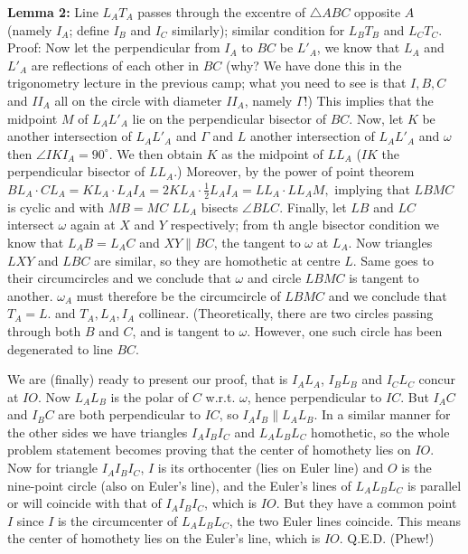 \documentclass[11pt,a4paper]{article}
\begin{document}
\begin{enumerate}
\textbf {Lemma 2:} Line $L_AT_A$ passes through the excentre of $\triangle ABC$ opposite $A$ (namely $I_A$; define $I_B$ and $I_C$ similarly); similar condition for $L_BT_B$ and $L_CT_C$.\\
Proof: Now let the perpendicular from $I_A$ to $BC$ be $L'_A$, we know that $L_A$ and $L'_A$ are reflections of each other in $BC$ (why? We have done this in the trigonometry lecture in the previous camp; what you need to see is that $I, B, C$ and $II_A$ all on the circle with diameter $II_A$, namely $\Gamma$!) This implies that the midpoint $M$ of $L_AL'_A$ lie on the perpendicular bisector of $BC$. Now, let $K$ be another intersection of $L_AL'_A$ and $\Gamma$ and $L$ another intersection of $L_AL'_A$ and $\omega$ then $\angle IKI_A=90^{\circ}$. We then obtain $K$ as the midpoint of $LL_A$ ($IK$ the perpendicular bisector of $LL_A$.) Moreover, by the power of point theorem $BL_A\cdot CL_A=KL_A\cdot L_AI_A=2KL_A\cdot\frac{1}{2} L_AI_A=LL_A\cdot LL_AM,$ implying that $LBMC$ is cyclic and with $MB=MC$ $LL_A$ bisects $\angle BLC$. Finally, let $LB$ and $LC$ intersect $\omega$ again at $X$ and $Y$ respectively; from th angle bisector condition we know that $L_AB=L_AC$ and $XY\parallel BC$, the tangent to $\omega$ at $L_A$. Now triangles $LXY$ and $LBC$ are similar, so they are homothetic at centre $L$. Same goes to their circumcircles and we conclude that $\omega$ and circle $LBMC$ is tangent to another. $\omega_A$ must therefore be the circumcircle of $LBMC$ and we conclude that $T_A=L$. and $T_A, L_A, I_A$ collinear. (Theoretically, there are two circles passing through both $B$ and $C$, and is tangent to $\omega$. However, one such circle has been degenerated to line $BC$.

We are (finally) ready to present our proof, that is $I_AL_A$, $I_BL_B$ and $I_CL_C$ concur at $IO$. Now $L_AL_B$ is the polar of $C$ w.r.t. $\omega$, hence perpendicular to $IC$. But $I_AC$ and $I_BC$ are both perpendicular to $IC$, so $I_AI_B\parallel L_AL_B$. In a similar manner for the other sides we have triangles $I_AI_BI_C$ and $L_AL_BL_C$ homothetic, so the whole problem statement becomes proving that the center of homothety lies on $IO$. Now for triangle $I_AI_BI_C$, $I$ is its orthocenter (lies on Euler line) and $O$ is the nine-point circle (also on Euler's line), and the Euler's lines of $L_AL_BL_C$ is parallel or will coincide with that of $I_AI_BI_C$, which is $IO$. But they have a common point $I$ since $I$ is the circumcenter of $L_AL_BL_C$, the two Euler lines coincide. This means the center of homothety lies on the Euler's line, which is $IO$. Q.E.D. (Phew!)

\end{enumerate}
\end{document}

